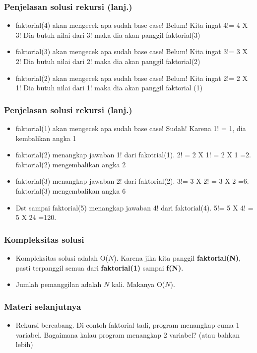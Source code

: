 \documentclass{beamer}
\begin{document}
\begin{frame}
\frametitle{Penjelasan solusi rekursi (lanj.) }
\begin {itemize}
    \item faktorial(4) akan mengecek apa sudah base case! Belum! Kita ingat 4!= 4 X 3! Dia butuh nilai dari 3! maka dia akan panggil faktorial(3)
    \item faktorial(3) akan mengecek apa sudah base case! Belum! Kita ingat 3!= 3 X 2! Dia butuh nilai dari 2! maka dia akan panggil faktorial(2)
    \item faktorial(2) akan mengecek apa sudah base case! Belum! Kita ingat 2!= 2 X 1! Dia butuh nilai dari 1! maka dia akan panggil faktorial (1)
\end{itemize}
\end{frame}

\begin{frame}
\frametitle{Penjelasan solusi rekursi (lanj.) }
\begin {itemize}
    \item faktorial(1) akan mengecek apa sudah base case! Sudah! Karena 1! = 1, dia kembalikan angka 1
    \item faktorial(2) menangkap jawaban 1! dari fakotrial(1). 2! = 2 X 1! = 2 X 1 =2. faktorial(2) mengembalikan angka 2
    \item faktorial(3) menangkap jawaban 2! dari faktorial(2). 3!= 3 X 2! = 3 X 2 =6. faktorial(3) mengembalikan angka 6
    \item Dst sampai faktorial(5) menangkap jawaban 4! dari faktorial(4). 5!= 5 X 4! = 5 X 24 =120.
\end{itemize}
\end{frame}

 
\begin{frame}
\frametitle{Kompleksitas solusi}
\begin {itemize}
   \item Kompleksitas solusi adalah O($N$). Karena jika kita panggil \alert{\textbf{faktorial(N)}}, pasti terpanggil semua dari \alert{\textbf{faktorial(1)}} sampai \alert{\textbf{f(N)}}.
   \item Jumlah pemanggilan adalah $N$ kali. Makanya O($N$).
\end {itemize}
\end{frame}
 
\begin{frame}
\frametitle{Materi selanjutnya}
\begin{itemize}
   \item Rekursi bercabang. Di contoh faktorial tadi, program menangkap cuma 1 variabel. Bagaimana kalau program menangkap 2 variabel? (atau bahkan lebih)    
\end {itemize}
\end{frame}
 
\end{document}
